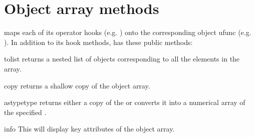 \section{Object array methods}
\label{sec:objectarray-methods}
 maps each of its operator hooks (e.g. ) onto
the corresponding object ufunc (e.g. ).  In addition
to its hook methods,   has these public methods:

\begin{methoddesc}[ObjectArray]{tolist}{}
   returns a nested list of objects corresponding to all the
  elements in the array.
\end{methoddesc}

\begin{methoddesc}[ObjectArray]{copy}{}
   returns a shallow copy of the object array.
\end{methoddesc}

\begin{methoddesc}[ObjectArray]{astype}{type}
   returns either a copy of the  or converts it
  into a numerical array of the specified .
\end{methoddesc}

\begin{methoddesc}[ObjectArray]{info}{}
   This will display key attributes of the object array.
\end{methoddesc}

